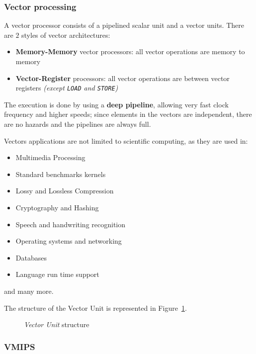 \documentclass[english]{article}
\begin{document}
\subsubsection{Vector processing}

A vector processor consists of a pipelined scalar unit and a vector units.
There are \(2\) styles of vector architectures:

\begin{itemize}
  \item \textbf{Memory-Memory} vector processors: all vector operations are memory to memory
  \item \textbf{Vector-Register} processors: all vector operations are between vector registers \textit{(except \texttt{LOAD} and \texttt{STORE})}
\end{itemize}

The execution is done by using a \textbf{deep pipeline}, allowing very fast clock frequency and higher speeds;
since elements in the vectors are independent, there are no hazards and the pipelines are always full.

Vectors applications are not limited to scientific computing, as they are used in:

\begin{itemize}
  \item Multimedia Processing
  \item Standard benchmarks kernels
  \item Lossy and Lossless Compression
  \item Cryptography and Hashing
  \item Speech and handwriting recognition
  \item Operating systems and networking
  \item Databases
  \item Language run time support
\end{itemize}

and many more.

The structure of the Vector Unit is represented in Figure~\ref{fig:vector-unit-structure}.

\begin{figure}
  \bigskip
  \centering
  \caption{\textit{Vector Unit} structure}
  \label{fig:vector-unit-structure}
  \bigskip
\end{figure}

\subsubsection{VMIPS}
\end{document}
